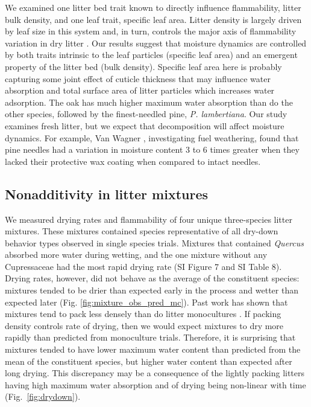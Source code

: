 \documentclass[letterpaper,12pt]{article}
\begin{document}
We examined one litter bed trait known to directly influence flammability,
litter bulk density, and one leaf trait, specific leaf area. Litter density is
largely driven by leaf size in this system and, in turn, controls the major
axis of flammability variation in dry litter \citep{Magalhaes+Schwilk-2012}.
Our results suggest that moisture dynamics are controlled by both traits
intrinsic to the leaf particles (specific leaf area) and an emergent property
of the litter bed (bulk density). Specific leaf area here is probably capturing
some joint effect of cuticle thickness that may influence water absorption and
total surface area of litter particles which increases water adsorption. The
oak has much higher maximum water absorption than do the other species,
followed by the finest-needled pine, \emph{P. lambertiana}. Our study examines
fresh litter, but we expect that decomposition will affect moisture dynamics.
For example, Van Wagner \citeyear{Van_Wagner-1969}, investigating fuel
weathering, found that pine needles had a variation in moisture content 3 to 6
times greater when they lacked their protective wax coating when compared to
intact needles.

\subsection*{Nonadditivity in litter mixtures}

We measured drying rates and flammability of four unique three-species litter
mixtures. These mixtures contained species representative of all dry-down
behavior types observed in single species trials. Mixtures that contained
\emph{Quercus} absorbed more water during wetting, and the one mixture without
any Cupressaceae had the most rapid drying rate (SI Figure 7 and SI Table 8).
Drying rates, however, did not behave as the average of the constituent
species: mixtures tended to be drier than expected early in the process and
wetter than expected later (Fig. \ref{fig:mixture_obs_pred_mc}). Past work has
shown that mixtures tend to pack less densely than do litter monocultures
\citep{Magalhaes+Schwilk-2012}. If packing density controls rate of drying,
then we would expect mixtures to dry more rapidly than predicted from
monoculture trials. Therefore, it is surprising that mixtures tended to have
lower maximum water content than predicted from the mean of the constituent
species, but higher water content than expected after long drying. This
discrepancy may be a consequence of the lightly packing litters having high
maximum water absorption and of drying being non-linear with time
(Fig.~\ref{fig:drydown}).
\end{document}
